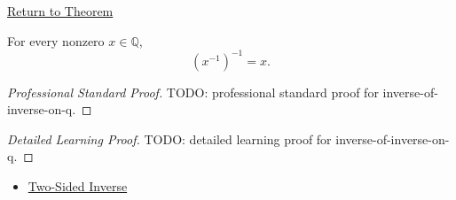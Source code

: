 \newpage
{}
\label{prf:inverse-of-inverse-on-q}

\begin{remark*}[Return]
\hyperref[cor:inverse-of-inverse-on-q]{Return to Theorem}
\end{remark*}

\begin{corollary*}
For every nonzero $x\in\mathbb{Q}$,
\[
(x^{-1})^{-1}=x.
\]
\end{corollary*}

\begin{proof}[Professional Standard Proof]
\LRAProofBodyStart
TODO: professional standard proof for inverse-of-inverse-on-q.
\end{proof}

\begin{proof}[Detailed Learning Proof]
\LRAProofBodyStart
TODO: detailed learning proof for inverse-of-inverse-on-q.
\end{proof}

\begin{remark*}
\end{remark*}

\begin{dependencies}
\begin{itemize}
  \item \hyperref[def:two-sided-inverse]{Two-Sided Inverse}
\end{itemize}
\end{dependencies}

\clearpage
